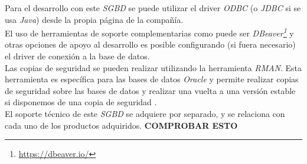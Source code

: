 \documentclass[11pt,a4paper]{article}
\begin{document}
Para el desarrollo con este \emph{SGBD} se puede utilizar el driver \emph{ODBC} (o \emph{JDBC} si se usa \emph{Java}) desde la propia página de la compañía. \\
El uso de herramientas de soporte complementarias como puede ser \emph{DBeaver\footnote{\url{https://dbeaver.io/}}} y otras opciones de apoyo al desarrollo es posible configurando (si fuera necesario) el driver de conexión a la base de datos. \\
Las copias de seguridad se pueden realizar utilizando la herramienta \emph{RMAN}. Esta herramienta es específica para las bases de datos \emph{Oracle} y permite realizar copias de seguridad sobre las bases de datos y realizar una vuelta a una versión estable si disponemos de una copia de seguridad \cite{ORA:8}. \\

El soporte técnico de este \emph{SGBD} se adquiere por separado, y se relaciona con cada uno de los productos adquiridos. \cite{ORA:4} \textbf{{\LARGE COMPROBAR ESTO}}

\newpage


\end{document}
